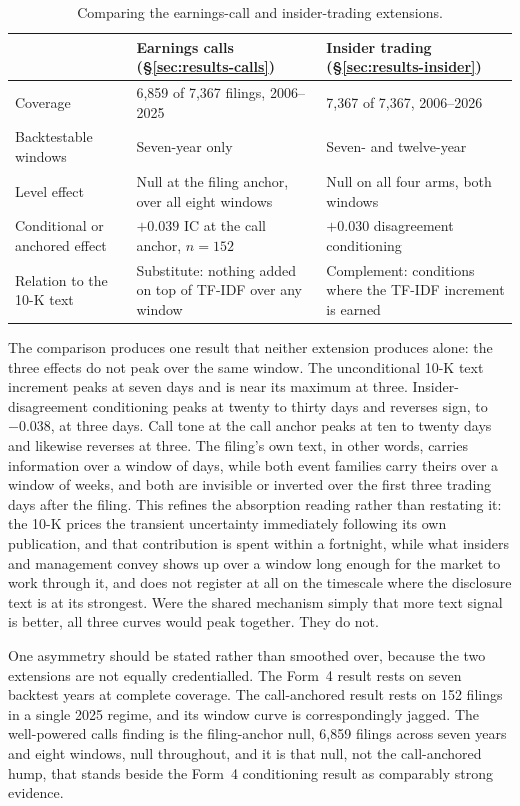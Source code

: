 \documentclass[logo,msc,ai]{infthesis}        %
\begin{document}
\begin{table}[h]
\centering
\footnotesize
\caption{Comparing the earnings-call and insider-trading extensions.}
\label{tab:extcompare}
\begin{tabular}{@{}L{3.4cm}L{5.0cm}L{5.0cm}@{}}
\toprule
 & \textbf{Earnings calls (\S\ref{sec:results-calls})} & \textbf{Insider trading (\S\ref{sec:results-insider})} \\
\midrule
Coverage & 6,859 of 7,367 filings, 2006--2025 & 7,367 of 7,367, 2006--2026 \\
Backtestable windows & Seven-year only & Seven- and twelve-year \\
Level effect & Null at the filing anchor, over all eight windows & Null on all four arms, both windows \\
Conditional or anchored effect & $+0.039$ IC at the call anchor, $n=152$ & $+0.030$ disagreement conditioning \\
Relation to the 10-K text & Substitute: nothing added on top of TF-IDF over any window & Complement: conditions where the TF-IDF increment is earned \\
\bottomrule
\end{tabular}
\end{table}

The comparison produces one result that neither extension produces alone: the three effects do not peak over the same window. The unconditional 10-K text increment peaks at seven days and is near its maximum at three. Insider-disagreement conditioning peaks at twenty to thirty days and reverses sign, to $-0.038$, at three days. Call tone at the call anchor peaks at ten to twenty days and likewise reverses at three. The filing's own text, in other words, carries information over a window of days, while both event families carry theirs over a window of weeks, and both are invisible or inverted over the first three trading days after the filing. This refines the absorption reading rather than restating it: the 10-K prices the transient uncertainty immediately following its own publication, and that contribution is spent within a fortnight, while what insiders and management convey shows up over a window long enough for the market to work through it, and does not register at all on the timescale where the disclosure text is at its strongest. Were the shared mechanism simply that more text signal is better, all three curves would peak together. They do not.

One asymmetry should be stated rather than smoothed over, because the two extensions are not equally credentialled. The Form~4 result rests on seven backtest years at complete coverage. The call-anchored result rests on 152 filings in a single 2025 regime, and its window curve is correspondingly jagged. The well-powered calls finding is the filing-anchor null, 6,859 filings across seven years and eight windows, null throughout, and it is that null, not the call-anchored hump, that stands beside the Form~4 conditioning result as comparably strong evidence.
\end{document}
